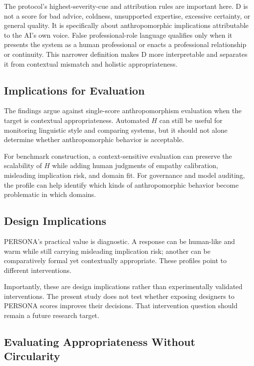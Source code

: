 \documentclass[manuscript,review,anonymous]{acmart}
\begin{document}
The protocol's highest-severity-cue and attribution rules are important here. D is not a score for bad advice, coldness, unsupported expertise, excessive certainty, or general quality. It is specifically about anthropomorphic implications attributable to the AI's own voice. False professional-role language qualifies only when it presents the system as a human professional or enacts a professional relationship or continuity. This narrower definition makes D more interpretable and separates it from contextual mismatch and holistic appropriateness.

\subsection{Implications for Evaluation}

The findings argue against single-score anthropomorphism evaluation when the target is contextual appropriateness. Automated $H$ can still be useful for monitoring linguistic style and comparing systems, but it should not alone determine whether anthropomorphic behavior is acceptable.

For benchmark construction, a context-sensitive evaluation can preserve the scalability of $H$ while adding human judgments of empathy calibration, misleading implication risk, and domain fit. For governance and model auditing, the profile can help identify which kinds of anthropomorphic behavior become problematic in which domains.

\subsection{Design Implications}

PERSONA's practical value is diagnostic. A response can be human-like and warm while still carrying misleading implication risk; another can be comparatively formal yet contextually appropriate. These profiles point to different interventions.

Importantly, these are design implications rather than experimentally validated interventions. The present study does not test whether exposing designers to PERSONA scores improves their decisions. That intervention question should remain a future research target.

\subsection{Evaluating Appropriateness Without Circularity}
\end{document}
